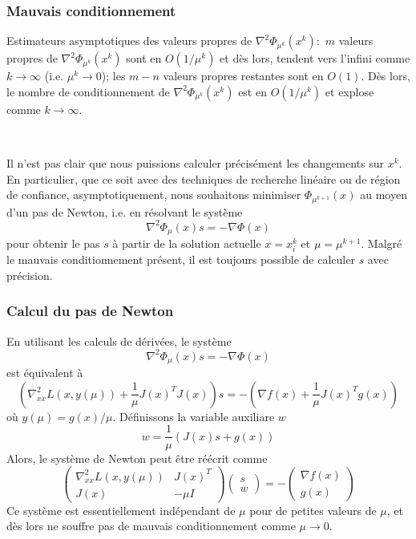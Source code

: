 \documentclass[t,usepdftitle=false]{beamer}
\begin{document}
\begin{frame}
\frametitle{Mauvais conditionnement}

Estimateurs asymptotiques des valeurs propres de
$
\nabla^2 \Phi_{\mu^k}(x^k):
$
$m$ valeurs propres de $\nabla^2 \Phi_{\mu^k}(x^k)$ sont en $O(1/\mu^k)$ et dès lors, tendent vers l'infini comme $k \rightarrow \infty$ (i.e. $\mu^k \rightarrow 0$); les $m-n$ valeurs propres restantes sont en $O(1)$.
Dès lors, le nombre de conditionnement de $\nabla^2 \Phi_{\mu^k}(x^k)$ est en $O(1/\mu^k)$ et explose comme $k \rightarrow \infty$.

\ 

Il n'est pas clair que nous puissions calculer précisément les changements sur $x^k$.
En particulier, que ce soit avec des techniques de recherche linéaire ou de région de confiance, asymptotiquement, nous souhaitons minimiser $\Phi_{\mu^{k+1}}(x)$ au moyen d'un pas de Newton, i.e. en résolvant le système
$$
\nabla^2 \Phi_{\mu}(x) s = -\nabla \Phi(x)
$$
pour obtenir le pas $s$ à partir de la solution actuelle $x = x_i^k$ et $\mu = \mu^{k+1}$.
Malgré le mauvais conditionnement présent, il est toujours possible de calculer $s$ avec précision.

\end{frame}

\begin{frame}
\frametitle{Calcul du pas de Newton}

En utilisant les calculs de dérivées, le système
$$
\nabla^2 \Phi_{\mu}(x) s = -\nabla \Phi(x)
$$
est équivalent à
$$
\left( \nabla^2_{xx} L(x, y(\mu)) + \frac{1}{\mu} J(x)^TJ(x) \right) s = - \left( \nabla f(x) + \frac{1}{\mu} J(x)^T g(x) \right)
$$
où $y(\mu) = g(x)/\mu$.
Définissons la variable auxiliare $w$
$$
w = \frac{1}{\mu} \left( J(x)s + g(x) \right)
$$
Alors, le système de Newton peut être réécrit comme
$$
\begin{pmatrix}
\nabla^2_{xx} L(x, y(\mu)) & J(x)^T \\
J(x) & -\mu I
\end{pmatrix}
\begin{pmatrix}
s \\ w
\end{pmatrix}
=
- \begin{pmatrix}
\nabla f(x) \\ g(x)
\end{pmatrix}
$$
Ce système est essentiellement indépendant de $\mu$ pour de petites valeurs de $\mu$, et dès lors ne souffre pas de mauvais conditionnement comme $\mu \rightarrow 0$.

\end{frame}
\end{document}
